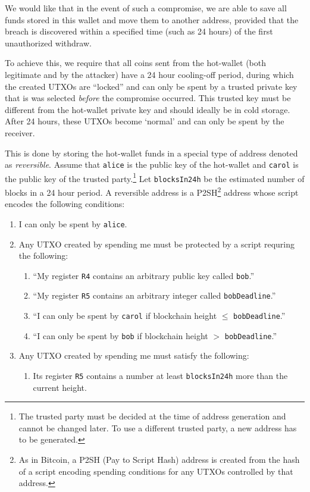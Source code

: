 \documentclass[11pt]{article}
\begin{document}
We would like that in the event of such a compromise, we are able to save all funds stored in this wallet and move them to another address, provided that the breach is discovered within a specified time (such as 24 hours) of the first unauthorized withdraw. 

To achieve this, we require that all coins sent from the hot-wallet (both legitimate and by the attacker)
have a 24 hour cooling-off period, during which the created UTXOs are ``locked'' and can only be spent by a trusted private key that is was selected {\em before} the compromise occurred. This trusted key must be different from the hot-wallet private key and should ideally be in cold storage. 
After 24 hours, these UTXOs become `normal' and can only be spent by the receiver.

This is done by storing the hot-wallet funds in a special type of address denoted as {\em reversible}. Assume that \texttt{alice} is the public key of the hot-wallet and \texttt{carol} is the public key of the trusted party.\footnote{The trusted party must be decided at the time of address generation and cannot be changed later. To use a different trusted party, a new address has to be generated.} Let \texttt{blocksIn24h} be the estimated number of blocks in a 24 hour period. A reversible address is a P2SH\footnote{As in Bitcoin, a P2SH (Pay to Script Hash) address is created from the hash of a script encoding spending conditions for any UTXOs controlled by that address.} address whose script encodes the following conditions:   
\begin{enumerate}
	\item I can only be spent by \texttt{alice}.
	\item Any UTXO created by spending me must be protected by a script requring the following: 	
	\begin{enumerate}
		\item ``My register \texttt{R4} contains an arbitrary public key called \texttt{bob}.'' 
		\item ``My register \texttt{R5} contains an arbitrary integer called \texttt{bobDeadline}.'' 
		\item ``I can only be spent by \texttt{carol} if blockchain height $\leq$ \texttt{bobDeadline}.''
		\item ``I can only be spent by \texttt{bob} if blockchain height $>$ \texttt{bobDeadline}.''	
	\end{enumerate}  
	\item Any UTXO created by spending me must satisfy the following: 	
	\begin{enumerate}
		\item Its register \texttt{R5} contains a number at least \texttt{blocksIn24h} more than the current height. 
	\end{enumerate}  
\end{enumerate}
\end{document}
